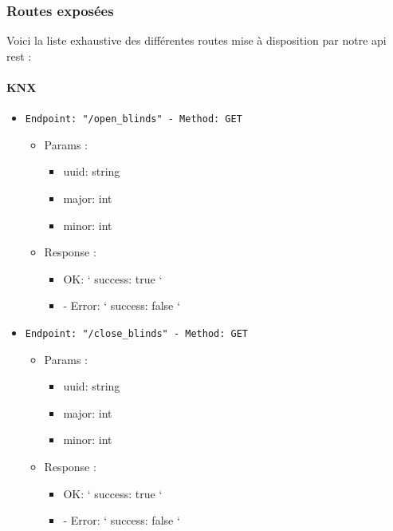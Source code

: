 \subsubsection{Routes exposées}
Voici la liste exhaustive des différentes routes mise à disposition par notre \acrshort{api} \acrshort{rest} : 

\paragraph{KNX}

\begin{itemize}
  \item \texttt{Endpoint: "/open_blinds" -  Method: GET}
  \begin{itemize} 
    \item Params :
    \begin{itemize}
      \item uuid: string
      \item major: int
      \item minor: int
    \end{itemize}

    \item Response : 
    \begin{itemize}
      \item  OK: `{ success: true }`
      \item - Error: `{ success: false }`
    \end{itemize}
  \end{itemize}
\end{itemize}


\begin{itemize}
  \item \texttt{Endpoint: "/close_blinds" -  Method: GET}
  \begin{itemize} 
    \item Params :
    \begin{itemize}
      \item uuid: string
      \item major: int
      \item minor: int
    \end{itemize}

    \item Response : 
    \begin{itemize}
      \item  OK: `{ success: true }`
      \item - Error: `{ success: false }`
    \end{itemize}
  \end{itemize}
\end{itemize}

